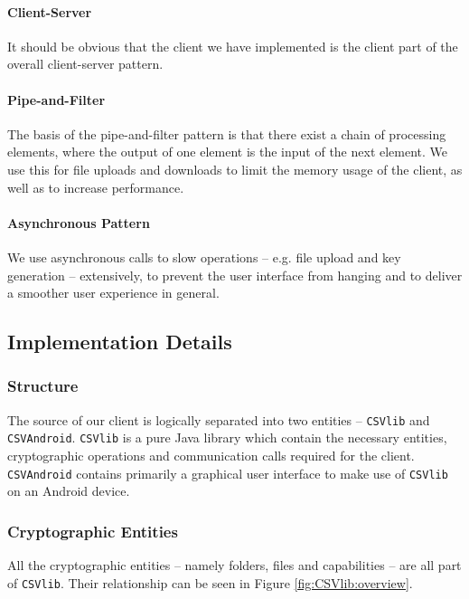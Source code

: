 \documentclass[pdftex,english,10pt,b5paper,twoside]{book}
\begin{document}
\paragraph{Client-Server} It should be obvious that the client we have
implemented is the client part of the overall client-server pattern.

\paragraph{Pipe-and-Filter} The basis of the pipe-and-filter pattern is that
there exist a chain of processing elements, where the output of one element is
the input of the next element. We use this for file uploads and downloads to
limit the memory usage of the client, as well as to increase performance.

\paragraph{Asynchronous Pattern} We use asynchronous calls to slow operations
-- e.g. file upload and key generation -- extensively, to prevent the user
interface from hanging and to deliver a smoother user experience in general.

\subsection{Implementation Details}
\label{sec:cli:impl:det}

\subsubsection{Structure}
The source of our client is logically separated into two entities --
\texttt{CSVlib} and \texttt{CSVAndroid}. \texttt{CSVlib} is a pure Java library which
contain the necessary entities, cryptographic operations and communication
calls required for the client. \texttt{CSVAndroid} contains primarily a graphical user
interface to make use of \texttt{CSVlib} on an Android device.

\subsubsection{Cryptographic Entities} 
\label{sec:cryptoentities} 

All the cryptographic entities -- namely folders, files and capabilities -- are
all part of \texttt{CSVlib}. Their relationship can be seen in Figure
\ref{fig:CSVlib:overview}.
\end{document}
